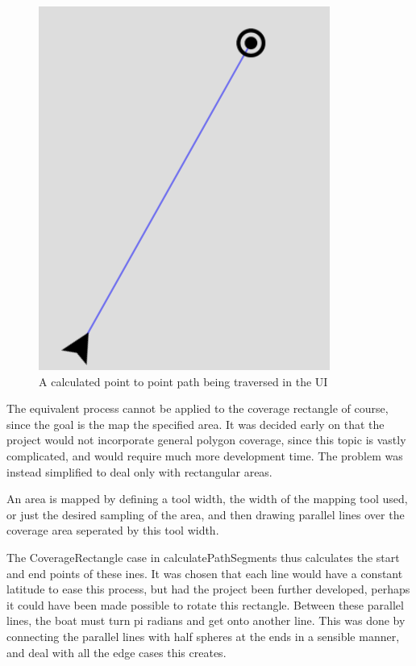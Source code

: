 \begin{figure}[H]
\centering
\includegraphics[width=0.9\linewidth]{Images/Implementation/P2P_path_calculated}
\caption{A calculated point to point path being traversed in the UI}
\label{fig:p2p_path_traversed}
\end{figure}

The equivalent process cannot be applied to the coverage rectangle of course, since the goal is the map the specified area. It was decided early on that the project would not incorporate general polygon coverage, since this topic is vastly complicated, and would require much more development time. The problem was instead simplified to deal only with rectangular areas.

An area is mapped by defining a tool width, the width of the mapping tool used, or just the desired sampling of the area, and then drawing parallel lines over the coverage area seperated by this tool width. 

The CoverageRectangle case in calculatePathSegments thus calculates the start and end points of these ines. It was chosen that each line would have a constant latitude to ease this process, but had the project been further developed, perhaps it could have been made possible to rotate this rectangle. Between these parallel lines, the boat must turn pi radians and get onto another line. This was done by connecting the parallel lines with half spheres at the ends in a sensible manner, and deal with all the edge cases this creates. 

